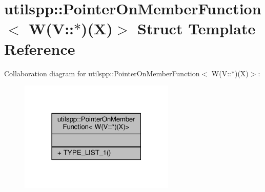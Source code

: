 \hypertarget{structutilspp_1_1PointerOnMemberFunction_3_01W_07V_1_1_5_08_07X_08_4}{\section{utilspp\-:\-:Pointer\-On\-Member\-Function$<$ W(V\-:\-:$\ast$)(X)$>$ Struct Template Reference}
\label{structutilspp_1_1PointerOnMemberFunction_3_01W_07V_1_1_5_08_07X_08_4}
}


Collaboration diagram for utilspp\-:\-:Pointer\-On\-Member\-Function$<$ W(V\-:\-:$\ast$)(X)$>$\-:
\nopagebreak
\begin{figure}[H]
\begin{center}
\leavevmode
\includegraphics[width=210pt]{structutilspp_1_1PointerOnMemberFunction_3_01W_07V_1_1_5_08_07X_08_4__coll__graph}
\end{center}
\end{figure}
